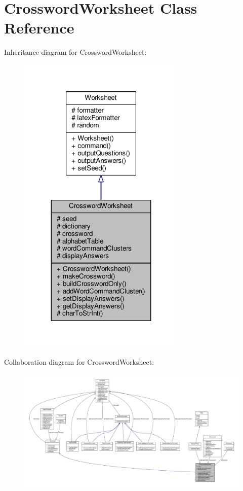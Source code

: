 \hypertarget{classCrosswordWorksheet}{}\section{Crossword\+Worksheet Class Reference}
\label{classCrosswordWorksheet}


Inheritance diagram for Crossword\+Worksheet\+:
\nopagebreak
\begin{figure}[H]
\begin{center}
\leavevmode
\includegraphics[width=227pt]{classCrosswordWorksheet__inherit__graph}
\end{center}
\end{figure}


Collaboration diagram for Crossword\+Worksheet\+:
\nopagebreak
\begin{figure}[H]
\begin{center}
\leavevmode
\includegraphics[width=350pt]{classCrosswordWorksheet__coll__graph}
\end{center}
\end{figure}

